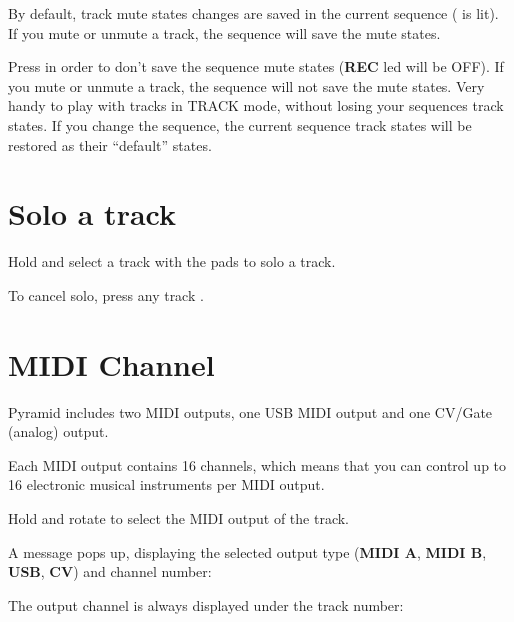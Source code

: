 By default, track mute states changes are saved in the current sequence ( is lit). If you mute or unmute a track, the sequence will save the mute states.


Press  in order to don't save the sequence mute states (\textbf{REC} led will be OFF). If you mute or unmute a track, the sequence will not save the mute states. Very handy to play with tracks in TRACK mode, without losing your sequences track states. If you change the sequence, the current sequence track states will be restored as their ``default'' states.


\section{Solo a track}

Hold  and select a track with the pads \stepbystepicon{} to solo a track.

To cancel solo, press any track \stepbystepicon{}.


\section{MIDI Channel}

Pyramid includes two MIDI outputs, one USB MIDI output and one CV/Gate (analog) output.

Each MIDI output contains 16 channels, which means that you can control up to 16 electronic musical instruments per MIDI output.

Hold  and rotate \encodericon{} to select the MIDI output of the track.


A message pops up, displaying the selected output type (\textbf{MIDI A}, \textbf{MIDI B}, \textbf{USB}, \textbf{CV}) and channel number:




The output channel is always displayed under the track number:


